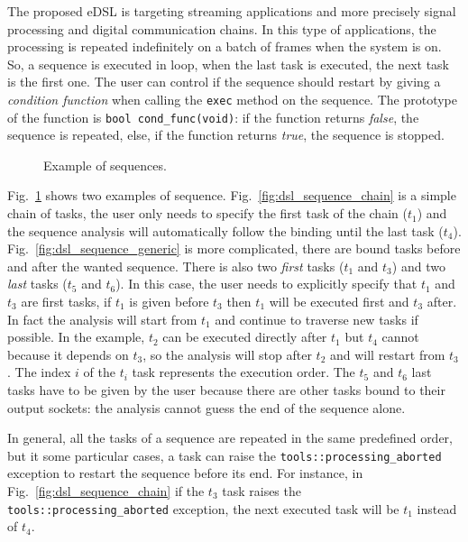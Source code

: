The proposed eDSL is targeting streaming applications and more precisely signal
processing and digital communication chains. In this type of applications, the
processing is repeated indefinitely on a batch of frames when the system is on.
So, a sequence is executed in loop, when the last task is executed, the next
task is the first one. The user can control if the sequence should restart by
giving a \emph{condition function} when calling the \verb|exec| method on the
sequence. The prototype of the function is \verb|bool cond_func(void)|: if the
function returns \emph{false}, the sequence is repeated, else, if the function
returns \emph{true}, the sequence is stopped.

\begin{figure}[htp]
  \centering
  \quad
  \caption{Example of sequences.}
  \label{fig:dsl_sequence}
\end{figure}

Fig.~\ref{fig:dsl_sequence} shows two examples of sequence.
Fig.~\ref{fig:dsl_sequence_chain} is a simple chain of tasks, the user only
needs to specify the first task of the chain ($t_1$) and the sequence analysis
will automatically follow the binding until the last task ($t_4$).
Fig.~\ref{fig:dsl_sequence_generic} is more complicated, there are bound tasks
before and after the wanted sequence. There is also two \emph{first} tasks
($t_1$ and $t_3$) and two \emph{last} tasks ($t_5$ and $t_6$). In this case, the
user needs to explicitly specify that $t_1$ and $t_3$ are first tasks, if $t_1$
is given before $t_3$ then $t_1$ will be executed first and $t_3$ after. In fact
the analysis will start from $t_1$ and continue to traverse new tasks if
possible. In  the example, $t_2$ can be executed directly after $t_1$ but $t_4$
cannot because it depends on $t_3$, so the analysis will stop after $t_2$ and
will restart from $t_3$. The index $i$ of the $t_i$ task represents the
execution order. The $t_5$ and $t_6$ last tasks have to be given by the user
because there are other tasks bound to their output sockets: the analysis cannot
guess the end of the sequence alone.

In general, all the tasks of a sequence are repeated in the same predefined
order, but it some particular cases, a task can raise the
\verb|tools::processing_aborted| exception to restart the sequence before its
end. For instance, in Fig.~\ref{fig:dsl_sequence_chain} if the $t_3$ task raises
the \verb|tools::processing_aborted| exception, the next executed task will be
$t_1$ instead of $t_4$.

